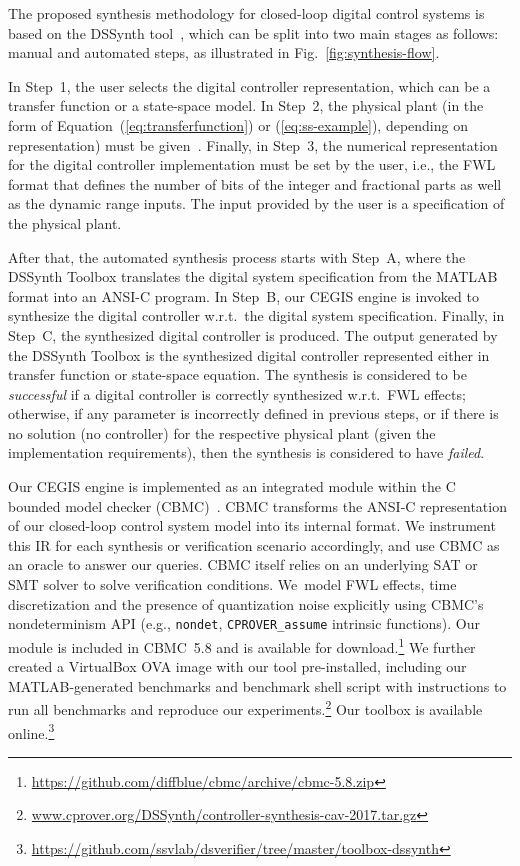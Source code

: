 \documentclass[10pt,conference]{IEEEtran}
\newcommand\tool{{DSSynth Toolbox}\xspace}
\begin{document}
The proposed synthesis methodology for closed-loop digital control
systems is based on the DSSynth tool~\cite{abate2017, abatecav2017}, 
which can be split into two main stages as follows: manual and 
automated steps, as illustrated in Fig.~\ref{fig:synthesis-flow}. 

In Step~1, the user selects the digital controller representation, which
can be a transfer function or a state-space model.  In Step~2, the
physical plant (in the form of Equation~(\ref{eq:transferfunction}) or
(\ref{eq:ss-example}), depending on representation) must be
given~\cite{astrom1997computer}.  Finally, in Step~3, the numerical
representation for the digital controller implementation must be set by the
user, i.e., the FWL format that defines the number of bits of the integer
and fractional parts as well as the dynamic range inputs.  The input 
provided by the user is a specification of the physical plant.

After that, the automated synthesis process starts with Step~A, where the
\tool translates the digital system specification from the MATLAB format
into an ANSI-C program.  In Step~B, our CEGIS engine is invoked to
synthesize the digital controller w.r.t.~the digital system specification. 
Finally, in Step~C, the synthesized digital controller is produced.  The
output generated by the \tool is the synthesized digital controller
represented either in transfer function or state-space equation.  The
synthesis is considered to be \emph{successful} if a digital controller is
correctly synthesized w.r.t.~FWL effects; otherwise, if any parameter is
incorrectly defined in previous steps, or if there is no solution (no
controller) for the respective physical plant (given the implementation
requirements), then the synthesis is considered to have \emph{failed}.

Our CEGIS engine is implemented as an integrated module within the C bounded
model checker (CBMC)~\cite{cbmc}.  CBMC transforms the ANSI-C representation
of our closed-loop control system model into its internal format.  We
instrument this IR for each synthesis or verification scenario accordingly,
and use CBMC as an oracle to answer our queries.  CBMC itself relies on an
underlying SAT or SMT solver to solve verification conditions.  We~model FWL
effects, time discretization and the presence of quantization noise
explicitly using CBMC's nondeterminism API (e.g., \texttt{nondet},
\texttt{CPROVER\_assume} intrinsic functions).  Our module is included in
CBMC~5.8 and is available for
download.\footnote{\url{https://github.com/diffblue/cbmc/archive/cbmc-5.8.zip}}
We further created a VirtualBox OVA image with our tool pre-installed,
including our MATLAB-generated benchmarks and benchmark shell script with
instructions to run all benchmarks and reproduce our
experiments.\footnote{\url{www.cprover.org/DSSynth/controller-synthesis-cav-2017.tar.gz}}
Our toolbox is available
online.\footnote{\url{https://github.com/ssvlab/dsverifier/tree/master/toolbox-dssynth}}
\end{document}

